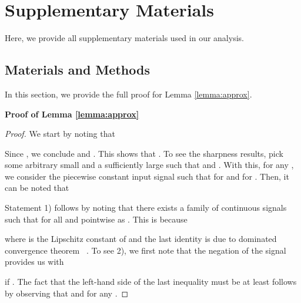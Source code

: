 \documentclass[12pt]{article}
\renewcommand{\thetable}{\textbf{\arabic{table}}}
\renewcommand{\thefigure}{\textbf{\arabic{figure}}}
\newcommand{\beginsupplement}{\setcounter{table}{0}
\renewcommand{\thetable}{S\arabic{table}}\setcounter{algorithm}{0}
\renewcommand{\thealgorithm}{S\arabic{algorithm}}\setcounter{equation}{0}
\renewcommand{\theequation}{S\arabic{equation}}\setcounter{figure}{0}
\renewcommand{\thefigure}{S\arabic{figure}}\setcounter{section}{0}
        \renewcommand{\thesection}{S\arabic{section}}}
\begin{document}
\clearpage

\beginsupplement

\section*{Supplementary Materials}
Here, we provide all supplementary materials used in our analysis. 

\subsection*{Materials and Methods}
In this section, we provide the full proof for Lemma \ref{lemma:approx}.

\noindent \textbf{Proof of Lemma \ref{lemma:approx}}
\begin{proof}
We start by noting that

Since , we conclude  and . This shows that . To see the sharpness results, pick some arbitrary small  and a sufficiently large  such that  and . With this, for any , we consider the piecewise constant input signal  such that  for  and  for . Then, it can be noted that


Statement 1) follows by noting that there exists a family of continuous signals  such that  for all  and  pointwise as . This is because

where  is the Lipschitz constant of  and the last identity is due to dominated convergence theorem~ \cite{Rudin76}. To see 2), we first note that the negation of the signal  provides us with

if . The fact that the left-hand side of the last inequality must be at least  follows by observing that  and  for any .
\end{proof}

\clearpage
\end{document}
